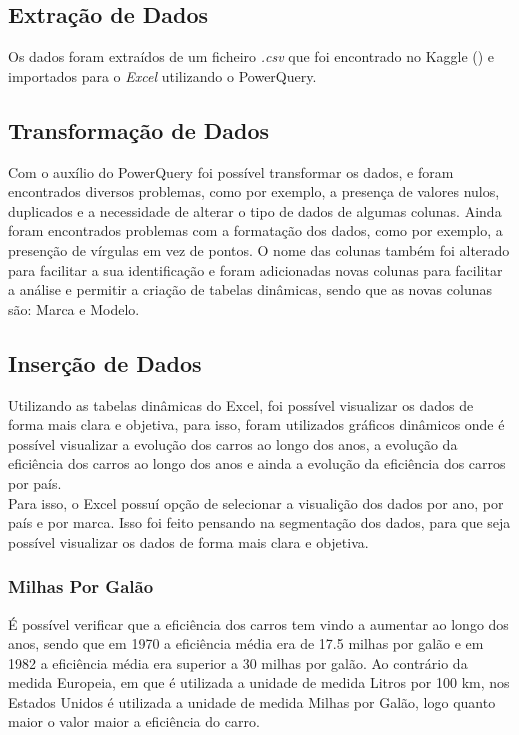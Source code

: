 \documentclass[a4paper]{article}
\begin{document}
\subsection{Extração de Dados}
Os dados foram extraídos de um ficheiro \textit{.csv} que foi encontrado no Kaggle (\cite{kaggle}) e 
importados para o \textit{Excel} utilizando o PowerQuery.
\subsection{Transformação de Dados}
Com o auxílio do PowerQuery foi possível transformar os dados, e foram encontrados diversos problemas,
como por exemplo, a presença de valores nulos, duplicados e a necessidade de alterar o tipo de dados de algumas colunas.
Ainda foram encontrados problemas com a formatação dos dados, como por exemplo, a presenção de vírgulas em vez de pontos.
O nome das colunas também foi alterado para facilitar a sua identificação e foram adicionadas novas colunas para facilitar a análise
e permitir a criação de tabelas dinâmicas, sendo que as novas colunas são: Marca e Modelo.

\subsection{Inserção de Dados}
Utilizando as tabelas dinâmicas do Excel, foi possível visualizar os dados de forma mais clara e objetiva,
para isso, foram utilizados gráficos dinâmicos onde é possível visualizar a evolução dos carros ao longo dos anos,
a evolução da eficiência dos carros ao longo dos anos e ainda a evolução da eficiência dos carros por país.
\\
Para isso, o Excel possuí opção de selecionar a visualição dos dados por ano, por país e por marca.
Isso foi feito pensando na segmentação dos dados, para que seja possível visualizar os dados de forma mais clara e objetiva.

\newpage

\subsubsection{Milhas Por Galão}
É possível verificar que a eficiência dos carros tem vindo a aumentar ao longo dos anos,
sendo que em 1970 a eficiência média era de 17.5 milhas por galão e em 1982 a eficiência média 
era superior a 30 milhas por galão. Ao contrário da medida Europeia, em que é utilizada a unidade de medida
Litros por 100 km, nos Estados Unidos é utilizada a unidade de medida Milhas por Galão, logo quanto maior o valor
maior a eficiência do carro.
\end{document}
